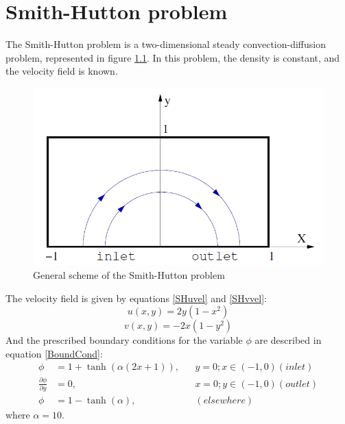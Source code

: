 \chapter{Smith-Hutton problem}
The Smith-Hutton problem is a two-dimensional steady convection-diffusion problem, represented in figure \ref{SHscheme}. In this problem, the density is constant, and the velocity field is known.
\begin{figure}[h]
	\centering
	\includegraphics[scale=0.7]{SmithHutton/SmithHutton}
	\caption{General scheme of the Smith-Hutton problem}
	\label{SHscheme}
\end{figure}
The velocity field is given by equations \ref{SHuvel} and \ref{SHvvel}:
\begin{equation}
u\left(x,y\right)=2y\left(1-x^{2}\right)
\label{SHuvel}
\end{equation}
\begin{equation}
v\left(x,y\right)=-2x\left(1-y^{2}\right)
\label{SHvvel}
\end{equation}
And the prescribed boundary conditions for the variable $\phi$ are described in equation \ref{BoundCond}:
\begin{equation}
\begin{aligned}
\phi &=1+\tanh\left(\alpha\left(2x+1\right)\right),&&y=0; x\in\left(-1,0\right) \left(inlet\right) \\
\frac{\partial\phi}{\partial y} &=0,&&x=0; y\in\left(-1,0\right) \left(outlet\right) \\
\phi &=1-\tanh\left(\alpha\right),&&\left(elsewhere\right)
\end{aligned}
\label{BoundCond}
\end{equation}
where $\alpha=10$.

